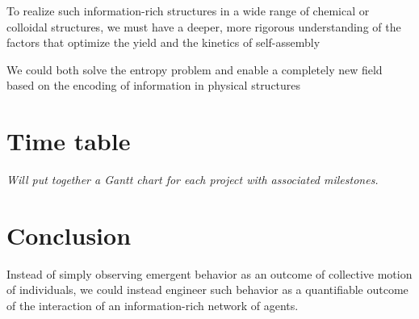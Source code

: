 \documentclass[11pt, oneside]{article}   	%
\begin{document}
To realize such information-rich structures in a wide range of chemical or colloidal structures, we must have a deeper, more rigorous understanding of the factors that optimize the yield and the kinetics of self-assembly

We could both solve the entropy problem and enable a completely new field based on the encoding of information in physical structures

\section{Time table}
\textit{Will put together a Gantt chart for each project with associated milestones. 	}

\section{Conclusion}
Instead of simply observing emergent behavior as an outcome of collective motion of individuals, we could instead engineer such behavior as a quantifiable outcome of the interaction of an information-rich network of agents.
\end{document}
